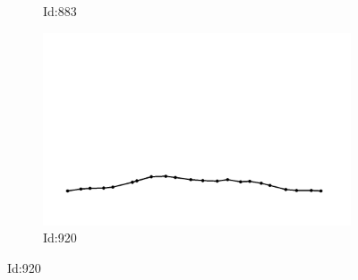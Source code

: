 \documentclass[12pt,twoside]{report}
\begin{document}
\begin{figure}
\begin{subfigure}[b]{0.20\textwidth}
\caption{Id:883}
\end{subfigure}
\begin{subfigure}[b]{0.20\textwidth}
\centering
\includegraphics[width=\textwidth]{../../trajectories/920.png}
\caption{Id:920}
\end{subfigure}
\end{figure}
\end{document}

